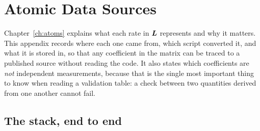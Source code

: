 \chapter{Atomic Data Sources}
\label{app:data}

Chapter~\ref{ch:atoms} explains what each rate in $\bm{L}$ represents and why it
matters. This appendix records where each one came from, which script converted
it, and what it is stored in, so that any coefficient in the matrix can be
traced to a published source without reading the code. It also states which
coefficients are \emph{not} independent measurements, because that is the single
most important thing to know when reading a validation table: a check between
two quantities derived from one another cannot fail.

\section{The stack, end to end}


